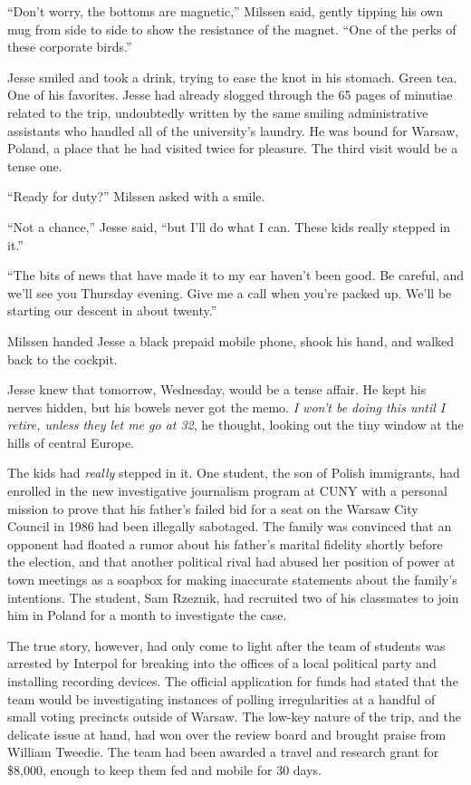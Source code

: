\documentclass[12pt]{book}
\begin{document}
``Don't worry, the bottoms are magnetic,'' Milssen said, gently tipping his own mug from side to side to show the resistance of the magnet.  ``One of the perks of these corporate birds.''

Jesse smiled and took a drink, trying to ease the knot in his stomach.  Green tea.  One of his favorites.  Jesse had already slogged through the 65 pages of minutiae related to the trip, undoubtedly written by the same smiling administrative assistants who handled all of the university's laundry.  He was bound for Warsaw, Poland, a place that he had visited twice for pleasure.  The third visit would be a tense one.

``Ready for duty?'' Milssen asked with a smile.

``Not a chance,'' Jesse said, ``but I'll do what I can.  These kids really stepped in it.''

``The bits of news that have made it to my ear haven't been good.  Be careful, and we'll see you Thursday evening.  Give me a call when you're packed up.  We'll be starting our descent in about twenty.''

Milssen handed Jesse a black prepaid mobile phone, shook his hand, and walked back to the cockpit.

Jesse knew that tomorrow, Wednesday, would be a tense affair.  He kept his nerves hidden, but his bowels never got the memo.  \emph{I won't be doing this until I retire, unless they let me go at 32}, he thought, looking out the tiny window at the hills of central Europe.

The kids had \emph{really} stepped in it.  One student, the son of Polish immigrants, had enrolled in the new investigative journalism program at CUNY with a personal mission to prove that his father's failed bid for a seat on the Warsaw City Council in 1986 had been illegally sabotaged.  The family was convinced that an opponent had floated a rumor about his father's marital fidelity shortly before the election, and that another political rival had abused her position of power at town meetings as a soapbox for making inaccurate statements about the family's intentions.  The student, Sam Rzeznik, had recruited two of his classmates to join him in Poland for a month to investigate the case.

The true story, however, had only come to light after the team of students was arrested by Interpol for breaking into the offices of a local political party and installing recording devices.  The official application for funds had stated that the team would be investigating instances of polling irregularities at a handful of small voting precincts outside of Warsaw.  The low-key nature of the trip, and the delicate issue at hand, had won over the review board and brought praise from William Tweedie.  The team had been awarded a travel and research grant for \$8,000, enough to keep them fed and mobile for 30 days.
\end{document}
